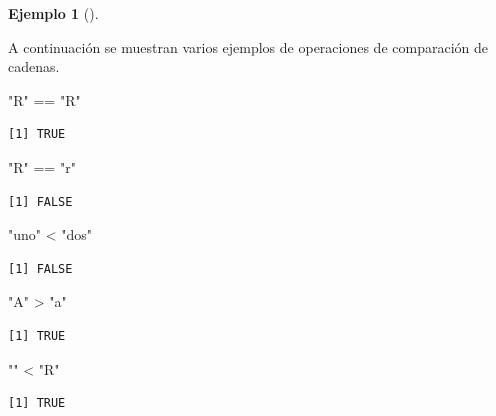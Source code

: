 \documentclass[
  a4paper,
]{scrreport}
\newenvironment{Shaded}{\begin{snugshade}}{\end{snugshade}}
\newcommand{\SpecialCharTok}[1]{\textcolor[rgb]{0.37,0.37,0.37}{#1}}
\newcommand{\StringTok}[1]{\textcolor[rgb]{0.13,0.47,0.30}{#1}}
\theoremstyle{definition}
\newtheorem{example}{Ejemplo}[chapter]
\theoremstyle{definition}
\theoremstyle{remark}
\begin{document}
\leavevmode{}%
\begin{example}[]\label{exm-operaciones-comparacion-cadenas}

A continuación se muestran varios ejemplos de operaciones de comparación
de cadenas.

\begin{Shaded}
\begin{Highlighting}[]
\StringTok{"R"} \SpecialCharTok{==} \StringTok{"R"}
\end{Highlighting}
\end{Shaded}

\begin{verbatim}
[1] TRUE
\end{verbatim}

\begin{Shaded}
\begin{Highlighting}[]
\StringTok{"R"} \SpecialCharTok{==} \StringTok{"r"}
\end{Highlighting}
\end{Shaded}

\begin{verbatim}
[1] FALSE
\end{verbatim}

\begin{Shaded}
\begin{Highlighting}[]
\StringTok{"uno"} \SpecialCharTok{\textless{}} \StringTok{"dos"}
\end{Highlighting}
\end{Shaded}

\begin{verbatim}
[1] FALSE
\end{verbatim}

\begin{Shaded}
\begin{Highlighting}[]
\StringTok{"A"} \SpecialCharTok{\textgreater{}} \StringTok{"a"}
\end{Highlighting}
\end{Shaded}

\begin{verbatim}
[1] TRUE
\end{verbatim}

\begin{Shaded}
\begin{Highlighting}[]
\StringTok{""} \SpecialCharTok{\textless{}} \StringTok{"R"}
\end{Highlighting}
\end{Shaded}

\begin{verbatim}
[1] TRUE
\end{verbatim}

\end{example}
\end{document}
